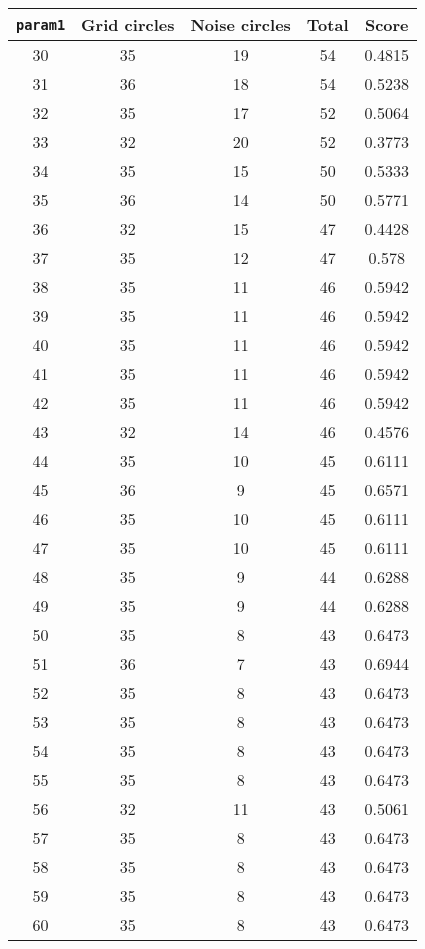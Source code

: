 \documentclass[letterpaper, 12pt]{article}
\begin{document}
\begin{longtable}{|c|c|c|c|c|}
\hline
\textbf{\texttt{param1}} & \textbf{Grid circles} & \textbf{Noise circles} & \textbf{Total} & \textbf{Score} \\
\hline
30 & 35 & 19 & 54 & 0.4815 \\
\hline
31 & 36 & 18 & 54 & 0.5238 \\
\hline
32 & 35 & 17 & 52 & 0.5064 \\
\hline
33 & 32 & 20 & 52 & 0.3773 \\
\hline
34 & 35 & 15 & 50 & 0.5333 \\
\hline
35 & 36 & 14 & 50 & 0.5771 \\
\hline
36 & 32 & 15 & 47 & 0.4428 \\
\hline
37 & 35 & 12 & 47 & 0.578 \\
\hline
38 & 35 & 11 & 46 & 0.5942 \\
\hline
39 & 35 & 11 & 46 & 0.5942 \\
\hline
40 & 35 & 11 & 46 & 0.5942 \\
\hline
41 & 35 & 11 & 46 & 0.5942 \\
\hline
42 & 35 & 11 & 46 & 0.5942 \\
\hline
43 & 32 & 14 & 46 & 0.4576 \\
\hline
44 & 35 & 10 & 45 & 0.6111 \\
\hline
45 & 36 & 9 & 45 & 0.6571 \\
\hline
46 & 35 & 10 & 45 & 0.6111 \\
\hline
47 & 35 & 10 & 45 & 0.6111 \\
\hline
48 & 35 & 9 & 44 & 0.6288 \\
\hline
49 & 35 & 9 & 44 & 0.6288 \\
\hline
50 & 35 & 8 & 43 & 0.6473 \\
\hline
51 & 36 & 7 & 43 & 0.6944 \\
\hline
52 & 35 & 8 & 43 & 0.6473 \\
\hline
53 & 35 & 8 & 43 & 0.6473 \\
\hline
54 & 35 & 8 & 43 & 0.6473 \\
\hline
55 & 35 & 8 & 43 & 0.6473 \\
\hline
56 & 32 & 11 & 43 & 0.5061 \\
\hline
57 & 35 & 8 & 43 & 0.6473 \\
\hline
58 & 35 & 8 & 43 & 0.6473 \\
\hline
59 & 35 & 8 & 43 & 0.6473 \\
\hline
60 & 35 & 8 & 43 & 0.6473 \\

\end{longtable}
\end{document}
